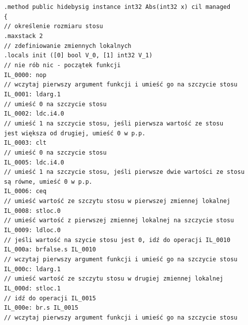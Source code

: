 \documentclass[12pt]{article}
\begin{document}
\texttt{.method public hidebysig instance int32  Abs(int32 x) cil managed \\
\{ \\
// określenie rozmiaru stosu \\
  .maxstack  2 \\
// zdefiniowanie zmiennych lokalnych \\
  .locals init ([0] bool V\_0, [1] int32 V\_1) \\
// nie rób nic - początek funkcji \\
  IL\_0000:  nop \\
// wczytaj pierwszy argument funkcji i umieść go na szczycie stosu \\
  IL\_0001:  ldarg.1 \\
// umieść 0 na szczycie stosu \\
  IL\_0002:  ldc.i4.0 \\
// umieść 1 na szczycie stosu, jeśli pierwsza wartość ze stosu\\
 jest większa od drugiej, umieść 0 w p.p. \\
  IL\_0003:  clt \\
// umieść 0 na szczycie stosu \\
  IL\_0005:  ldc.i4.0 \\
// umieść 1 na szczycie stosu, jeśli pierwsze dwie wartości ze stosu\\
 są równe, umieść 0 w p.p. \\
  IL\_0006:  ceq \\
// umieść wartość ze szczytu stosu w pierwszej zmiennej lokalnej \\
  IL\_0008:  stloc.0 \\
// umieść wartość z pierwszej zmiennej lokalnej na szczycie stosu \\
  IL\_0009:  ldloc.0 \\
// jeśli wartość na szycie stosu jest 0, idź do operacji IL\_0010 \\
  IL\_000a:  brfalse.s  IL\_0010 \\
// wczytaj pierwszy argument funkcji i umieść go na szczycie stosu \\
  IL\_000c:  ldarg.1 \\
// umieść wartość ze szczytu stosu w drugiej zmiennej lokalnej \\
  IL\_000d:  stloc.1 \\
// idź do operacji IL\_0015 \\
  IL\_000e:  br.s       IL\_0015 \\
// wczytaj pierwszy argument funkcji i umieść go na szczycie stosu \\
}
\end{document}
